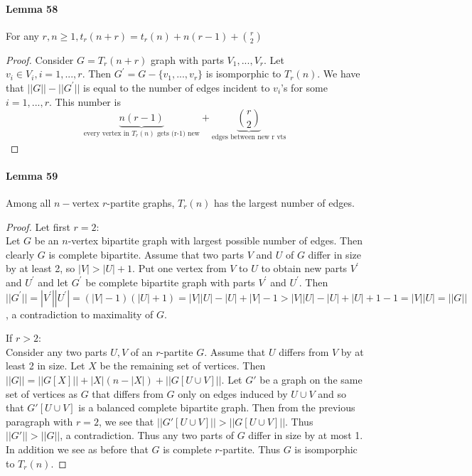 \paragraph{Lemma 58} For any $ r,n \geq 1, t_r(n+r) = t_r(n) + n(r-1) 
+ \binom{r}{2}$
\begin{proof}
    Consider $ G = T_r(n+r) $ graph with parts $ V_1,...,V_r$. Let 
    $ v_i \in V_i, i = 1,...,r$. Then $ G^\prime = G - \{v_1,...,v_r\} $ 
    is isomporphic to $T_r(n)$. We have that $ ||G|| - ||G^\prime|| $ is
    equal to the number of edges incident to $ v_i$'s for some $ i = 1,...,r$.
    This number is $$ \underbrace{n(r-1)}_{\text{every vertex in } T_r(n) 
    \text{ gets (r-1) new}}
    + \underbrace{\binom{r}{2}}_\text{edges between new r vts} $$
\end{proof}

\paragraph{Lemma 59} Among all $n-$vertex $r$-partite graphs, $ T_r(n) $ has
the largest number of edges.
\begin{proof}
    Let first $ r = 2 $: \\
    Let $G$ be an $n$-vertex bipartite graph with largest possible
    number of edges. Then clearly $G$ is complete bipartite. Assume that 
    two parts $ V $ and $U$ of $G$ differ in size by at least 2,
    so $ |V| > |U| + 1$. Put one vertex from $ V $ to $ U $
    to obtain new parts $ V^\prime $ and $ U^\prime $ 
    and let $ G^\prime $ be complete bipartite graph with parts $ V^\prime $ and 
    $ U^\prime $. Then $ ||G^\prime|| = |V^\prime||U^\prime| = (|V|-1)(|U|+1) 
    = |V||U| - |U| + |V| -1 > |V||U| - |U| + |U| + 1 - 1 = |V||U| = ||G||$, a 
    contradiction to maximality of $G$.

    \bigskip \noindent
    If $ r > 2 $: \\
    Consider any two parts $U,V$ of an $r$-partite $G$. Assume that $U$ differs
    from $V$ by at least 2 in size. Let $X$ be the remaining set of vertices. 
    Then $ ||G|| = ||G[X]|| + |X|(n-|X|) + ||G[U\cup V]|| $.  Let $G'$ be a 
    graph on the same set of vertices as $G$ that differs from $G$ only on edges 
    induced by $ U \cup V $ and so that $ G'[U \cup V] $ is a balanced complete 
    bipartite graph. Then from the previous paragraph with $r = 2$, we see that 
    $ ||G'[U \cup V]|| > ||G[U \cup V]||$. Thus $ ||G'|| > ||G||$, a
    contradiction. Thus any two parts of $ G $ differ in size by at most 1. In 
    addition we see as before that $ G $ is complete $r$-partite. Thus $ G $ is 
    isomporphic to $T_r(n)$.      
\end{proof}


